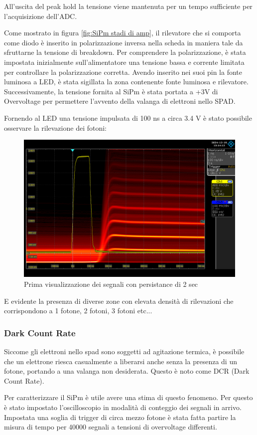 All'uscita del peak hold la tensione viene mantenuta per un tempo sufficiente per l'acquisizione dell'ADC.

Come mostrato in figura \ref{fig:SiPm stadi di amp}, il rilevatore che si comporta come diodo è inserito in polarizzazione inversa nella scheda in maniera tale da sfruttarne la tensione di breakdown. Per comprendere la polarizzazione, è stata impostata inizialmente sull'alimentatore una tensione bassa e corrente limitata per controllare la polarizzazione corretta. Avendo inserito nei suoi pin la fonte luminosa a LED, è stata sigillata la zona contenente fonte luminosa e rilevatore. Successivamente, la tensione fornita al SiPm è stata portata a +3V di Overvoltage per permettere l'avvento della valanga di elettroni nello SPAD.

Fornendo al LED una tensione impulsata di 100 ns a circa 3.4 V è stato possibile osservare la rilevazione dei fotoni:

\begin{figure}[!h]
    \centering
    \includegraphics[width=0.5\linewidth]{assets/SiPm/SiPm.png}
    \caption{Prima visualizzazione dei segnali con persistance di 2 sec}
\end{figure}

E evidente la presenza di diverse zone con elevata densità di rilevazioni
che corrispondono a 1 fotone, 2 fotoni, 3 fotoni etc...

\subsubsection{Dark Count Rate}
Siccome gli elettroni nello spad sono soggetti ad agitazione termica, è possibile che un elettrone riesca casualmente a liberarsi anche senza la presenza di un fotone, portando a una valanga non desiderata. Questo è noto come DCR (Dark Count Rate).

Per caratterizzare il SiPm è utile avere una stima di questo fenomeno. Per questo è stato impostato l'oscilloscopio in modalità di conteggio dei segnali in arrivo. Impostata una soglia di trigger di circa mezzo fotone è stata fatta partire la misura di tempo per 40000 segnali a tensioni di overvoltage differenti.

